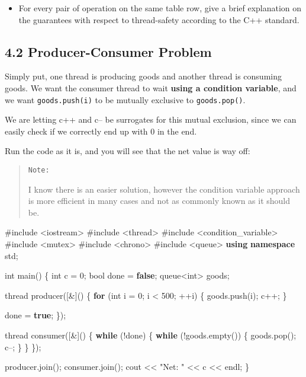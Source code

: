 \documentclass[]{article}
\newenvironment{Shaded}{}{}
\newcommand{\KeywordTok}[1]{\textcolor[rgb]{0.00,0.44,0.13}{\textbf{{#1}}}}
\newcommand{\DataTypeTok}[1]{\textcolor[rgb]{0.56,0.13,0.00}{{#1}}}
\newcommand{\DecValTok}[1]{\textcolor[rgb]{0.25,0.63,0.44}{{#1}}}
\newcommand{\StringTok}[1]{\textcolor[rgb]{0.25,0.44,0.63}{{#1}}}
\newcommand{\OtherTok}[1]{\textcolor[rgb]{0.00,0.44,0.13}{{#1}}}
\newcommand{\NormalTok}[1]{{#1}}
\providecommand{\tightlist}{%
  \setlength{\itemsep}{0pt}\setlength{\parskip}{0pt}}
\begin{document}
\begin{itemize}
\tightlist
\item
  For every pair of operation on the same table row, give a brief
  explanation on the guarantees with respect to thread-safety according
  to the C++ standard.
\end{itemize}

\subsection{4.2 Producer-Consumer
Problem}\label{producer-consumer-problem}

Simply put, one thread is producing goods and another thread is
consuming goods. We want the consumer thread to wait \textbf{using a
condition variable}, and we want \texttt{goods.push(i)} to be mutually
exclusive to \texttt{goods.pop()}.

We are letting c++ and c-- be surrogates for this mutual exclusion,
since we can easily check if we correctly end up with 0 in the end.

Run the code as it is, and you will see that the net value is way off:

\begin{quote}
\texttt{Note:}

I know there is an easier solution, however the condition variable
approach is more efficient in many cases and not as commonly known as it
should be.
\end{quote}

\begin{Shaded}
\begin{Highlighting}[]
\OtherTok{#include <iostream>}
\OtherTok{#include <thread>}
\OtherTok{#include <condition_variable>}
\OtherTok{#include <mutex>}
\OtherTok{#include <chrono>}
\OtherTok{#include <queue>}
\KeywordTok{using} \KeywordTok{namespace} \NormalTok{std;}

\DataTypeTok{int} \NormalTok{main() \{}
    \DataTypeTok{int} \NormalTok{c = }\DecValTok{0}\NormalTok{;}
    \DataTypeTok{bool} \NormalTok{done = }\KeywordTok{false}\NormalTok{;}
    \NormalTok{queue<}\DataTypeTok{int}\NormalTok{> goods;}

    \NormalTok{thread producer([&]() \{}
        \KeywordTok{for} \NormalTok{(}\DataTypeTok{int} \NormalTok{i = }\DecValTok{0}\NormalTok{; i < }\DecValTok{500}\NormalTok{; ++i) \{}
            \NormalTok{goods.push(i);}
            \NormalTok{c++;}
        \NormalTok{\}}

        \NormalTok{done = }\KeywordTok{true}\NormalTok{;}
    \NormalTok{\});}

    \NormalTok{thread consumer([&]() \{}
        \KeywordTok{while} \NormalTok{(!done) \{}
            \KeywordTok{while} \NormalTok{(!goods.empty()) \{}
                \NormalTok{goods.pop();}
                \NormalTok{c--;}
            \NormalTok{\}}
        \NormalTok{\}}
    \NormalTok{\});}

    \NormalTok{producer.join();}
    \NormalTok{consumer.join();}
    \NormalTok{cout << }\StringTok{"Net: "} \NormalTok{<< c << endl;}
\NormalTok{\}}
\end{Highlighting}
\end{Shaded}
\end{document}
